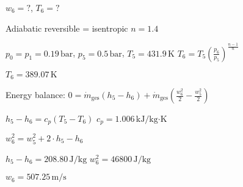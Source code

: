 \( w_6 = ? \), \( T_6 = ? \)  

Adiabatic reversible = isentropic  
\( n = 1.4 \)  

\( p_0 = p_1 = 0.19 \, \text{bar} \), \( p_5 = 0.5 \, \text{bar} \), \( T_5 = 431.9 \, \text{K} \)  
\( T_6 = T_5 \left( \frac{p_6}{p_5} \right)^{\frac{n-1}{n}} \)  

\( T_6 = 389.07 \, \text{K} \)  

Energy balance:  
\( 0 = \dot{m}_{\text{ges}} (h_5 - h_6) + \dot{m}_{\text{ges}} \left( \frac{w_6^2}{2} - \frac{w_5^2}{2} \right) \)  

\( h_5 - h_6 = c_p (T_5 - T_6) \)  
\( c_p = 1.006 \, \text{kJ/kg·K} \)  

\( w_6^2 = w_5^2 + 2 \cdot h_5 - h_6 \)  

\( h_5 - h_6 = 208.80 \, \text{J/kg} \)  
\( w_6^2 = 46800 \, \text{J/kg} \)  

\( w_6 = 507.25 \, \text{m/s} \)